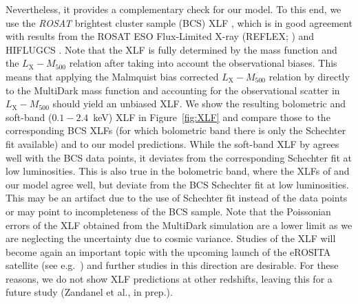 \documentclass[traditabstract]{aa}
\newcommand{\rmn}{\mathrm}
\begin{document}
Nevertheless, it provides a complementary check for our model. To this end, we
use the \emph{ROSAT} brightest cluster sample (BCS) XLF
\citep{1997ApJ...479L.101E}, which is in good agreement with results from the
ROSAT ESO Flux-Limited X-ray (REFLEX; \citealp{2002ApJ...566...93B}) and
HIFLUGCS \citep{2002ApJ...567..716R}.  Note that the XLF is fully determined by
the mass function and the $L_{\rmn{X}}-M_{500}$ relation after taking into
account the observational biases. This means that applying the Malmquist bias
corrected $L_{\rmn{X}}-M_{500}$ relation by \cite{2010MNRAS.406.1773M} directly
to the MultiDark mass function and accounting for the observational scatter in
$L_{\rmn{X}}-M_{500}$ should yield an unbiased XLF. We show the resulting
bolometric and soft-band ($0.1-2.4$~keV) XLF in Figure~\ref{fig:XLF} and compare
those to the corresponding BCS XLFs (for which bolometric band there is only the 
Schechter fit available) and to our model predictions.  While the soft-band XLF by
\cite{2010MNRAS.406.1773M} agrees well with the BCS data points, it deviates
from the corresponding Schechter fit at low luminosities. This is also true in
the bolometric band, where the XLFs of \cite{2010MNRAS.406.1773M} and our model
agree well, but deviate from the BCS Schechter fit at low luminosities. This may
be an artifact due to the use of Schechter fit instead of the data points or may
point to incompleteness of the BCS sample. Note that the Poissonian errors of
the XLF obtained from the MultiDark simulation are a lower limit as we are
neglecting the uncertainty due to cosmic variance.  Studies of the XLF will
become again an important topic with the upcoming launch of the eROSITA
satellite (see e.g.~\citealp{2011MSAIS..17..159C}) and further studies in this
direction are desirable. For these reasons, we do not show XLF predictions at
other redshifts, leaving this for a future study (Zandanel et al., in prep.).
\end{document}
